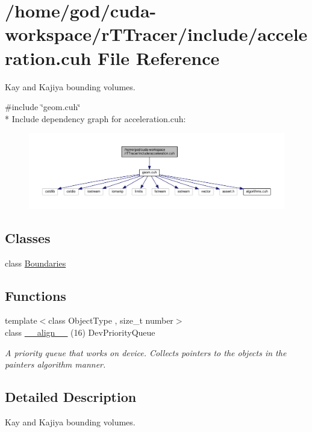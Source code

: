 \hypertarget{r_t_tracer_2include_2acceleration_8cuh}{}\section{/home/god/cuda-\/workspace/r\+T\+Tracer/include/acceleration.cuh File Reference}
\label{r_t_tracer_2include_2acceleration_8cuh}


Kay and Kajiya bounding volumes.  


{\ttfamily \#include \char`\"{}geom.\+cuh\char`\"{}}\\*
Include dependency graph for acceleration.\+cuh\+:
\nopagebreak
\begin{figure}[H]
\begin{center}
\leavevmode
\includegraphics[width=350pt]{r_t_tracer_2include_2acceleration_8cuh__incl}
\end{center}
\end{figure}
\subsection*{Classes}
\begin{DoxyCompactItemize}
\item 
class \hyperlink{class_boundaries}{Boundaries}
\end{DoxyCompactItemize}
\subsection*{Functions}
\begin{DoxyCompactItemize}
\item 
{\footnotesize template$<$class Object\+Type , size\+\_\+t number$>$ }\\class \hyperlink{r_t_tracer_2include_2acceleration_8cuh_a070af818501609893fa3557d5f97d5bb}{\+\_\+\+\_\+align\+\_\+\+\_\+} (16) Dev\+Priority\+Queue\hypertarget{r_t_tracer_2include_2acceleration_8cuh_a070af818501609893fa3557d5f97d5bb}{}\label{r_t_tracer_2include_2acceleration_8cuh_a070af818501609893fa3557d5f97d5bb}

\begin{DoxyCompactList}\small\item\em A priority queue that works on device. Collects pointers to the objects in the painter\textquotesingle{}s algorithm manner. \end{DoxyCompactList}\end{DoxyCompactItemize}


\subsection{Detailed Description}
Kay and Kajiya bounding volumes. 

